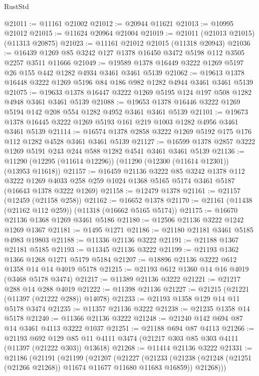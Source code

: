 \begin{lexlean}{RustStd}
\begin{coremodule}
@21011 := @11161 @21002
@21012 := @20944 @11621
@21013 := @10995 @21012
@21015 := @11624 @20964 @21004
@21019 := @21011 (@21013 @21015) (@11313 @20875)
@21023 := @11161 @21012 @21015 (@11318 @20943)
@21036 := @16439 @1269 @85 @3242 @127 @1378 @16450 @3472 @5198 @112 @3505 @2257 @3511 @11666
@21049 := @19589 @1378 @16449 @3222 @1269 @5197 @26 @155 @442 @1282 @4934 @3461 @3461 @5139
@21062 := @19613 @1378 @16448 @3222 @1269 @5196 @84 @186 @982 @1282 @4944 @3461 @3461 @5139
@21075 := @19633 @1378 @16447 @3222 @1269 @5195 @124 @197 @508 @1282 @4948 @3461 @3461 @5139
@21088 := @19653 @1378 @16446 @3222 @1269 @5194 @142 @208 @554 @1282 @4952 @3461 @3461 @5139
@21101 := @19673 @1378 @16445 @3222 @1269 @5193 @161 @219 @1003 @1282 @4956 @3461 @3461 @5139
@21114 := @16574 @1378 @2858 @3222 @1269 @5192 @175 @176 @112 @1282 @4528 @3461 @3461 @5139
@21127 := @16599 @1378 @2857 @3222 @1269 @5191 @243 @244 @588 @1282 @4541 @3461 @3461 @5139
@21136 := @11290 (@12295 (@11614 @12296)) (@11290 (@12300 (@11614 @12301)) (@13953 @11618))
@21157 := @16459
    @21136
    @3222
    @85
    @3242
    @1378
    @112
    @3222
    @1269
    @4033
    @258
    @259
    @1024
    @1368
    @5165
    @5174
    @3461
    @5187
    (@16643 @1378 @3222 @1269)
@21158 := @12479 @1378
@21161 := @21157 (@12459 (@21158 @258))
@21162 := @16652 @1378
@21170 := @21161 (@11438 (@21162 @112 @259)) (@11318 (@16662 @5165 @5174))
@21175 := @16670 @21136 @1368 @1269 @3461 @5186
@21180 := @12506 @21136 @3222 @1242 @1269 @1367
@21181 := @1495 @1271
@21186 := @21180 @21181 @3461 @5185 @4983 @19803
@21188 := @11336 @21136 @3222
@21191 := @21188 @1367 @21181 @5185
@21193 := @11345 @21136 @3222
@21199 := @21193 @1362 @1366 @1268 @1271 @5179 @5184
@21207 := @18896 @21136 @3222 @612 @1358 @14 @14 @4019 @5178
@21215 := @21193 @612 @1360 @14 @16 @4019 (@3468 @5178 @3474)
@21217 := @11389 @21136 @3222
@21221 := @21217 @288 @14 @288 @4019
@21222 := @11398 @21136
@21227 := @21215 (@21221 (@11397 (@21222 @288)) @14078)
@21233 := @21193 @1358 @129 @14 @11 @5178 @3474
@21235 := @11357 @21136 @3222
@21238 := @21235 @1358 @14 @5178
@21240 := @11366 @21136 @3222
@21248 := @21240 @142 @694 @87 @14 @3461 @4113 @3222 @1037
@21251 := @21188 @694 @87 @4113
@21266 := @21193
    @692
    @129
    @85
    @11
    @4111
    @3474
    (@21217 @303 @85 @303 @4111 (@11397 (@21222 @303)) @13618)
@21268 := @11414 @21136 @3222
@21331 := @21186
    (@21191
      (@21199
        (@21207
          (@21227
            (@21233
              (@21238 (@21248 (@21251 (@21266 @21268)) @11674 @11677 @11680 @11683 @16859))
              @21268)))

\end{coremodule}
\end{lexlean}
